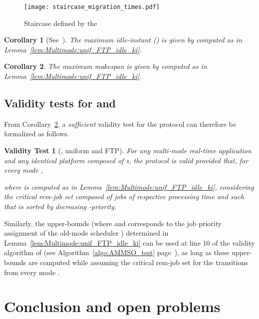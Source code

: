 \documentclass{article}
\newtheorem{validity test}{Validity Test}
\newtheorem{Corollary}{Corollary}
\begin{document}
\begin{figure}
\texttt{[image: staircase\_migration\_times.pdf]}
\caption{Staircase defined by the }
\label{fig:Multimode:unif_FTP_idle_ki}
\end{figure}

\begin{Corollary}[See~\cite{MeumeuNelisGoossens:10}]
\label{cor:Multimode:unif_FTP_maxidle}
The maximum idle-instant  () is given by  computed as in Lemma~\ref{lem:Multimode:unif_FTP_idle_ki}. 
\end{Corollary}

\begin{Corollary}
\label{cor:Multimode:unif_FTP_makespan}
The maximum makespan  is given by  computed as in Lemma~\ref{lem:Multimode:unif_FTP_idle_ki}.
\end{Corollary}

\subsection{Validity tests for  and }
\label{sec:Multimode:unif_FTP_validity_test}

From Corollary~\ref{cor:Multimode:unif_FTP_makespan}, a \emph{sufficient} validity test for the protocol  can therefore be formalized as follows. 

\begin{validity test}[, uniform and FTP]
\label{validitytest:Multimode:unif_FTP_SMMSO}
For any multi-mode real-time application  and any identical platform  composed of  s, the protocol  is valid provided that, for every mode ,

where  is computed as  in Lemma~\ref{lem:Multimode:unif_FTP_idle_ki}, considering the critical rem-job set  composed of  jobs  of respective processing time  and such that  is sorted by decreasing -priority.
\end{validity test}

Similarly, the upper-bounds  (where  and  corresponds to the job priority assignment of the old-mode scheduler ) determined in Lemma~\ref{lem:Multimode:unif_FTP_idle_ki} can be used at line 10 of the validity algorithm of  (see Algorithm~\ref{algo:AMMSO_test} page~\pageref{algo:AMMSO_test}), as long as these upper-bounds are computed while assuming the critical rem-job set  for the transitions from every mode . 
 


\section{Conclusion and open problems}
\label{sec:Multimode:Conclusion}
\end{document}
